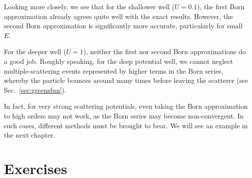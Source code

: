\documentclass[prx,12pt]{revtex4-2}
\begin{document}
Looking more closely, we see that for the shallower well ($U = 0.1$),
the first Born approximation already agrees quite well with the exact
results.  However, the second Born approximation is significantly more
accurate, particularly for small $E$.

For the deeper well ($U = 1$), neither the first nor second Born
approximations do a good job.  Roughly speaking, for the deep
potential well, we cannot neglect multiple-scattering events
represented by higher terms in the Born series, whereby the particle
bounces around many times before leaving the scatterer (see
Sec.~\ref{sec:greensfun}).

In fact, for very strong scattering potentials, even taking the Born
approximation to high orders may not work, as the Born series may
become non-convergent.  In such cases, different methods must be
brought to bear.  We will see an example in the next chapter.

\section*{Exercises}
\end{document}
